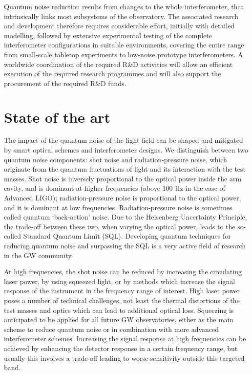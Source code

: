 Quantum noise reduction results from changes to the whole interferometer, that intrinsically links most subsystems of the observatory. The associated research and development therefore requires considerable effort, initially with detailed modelling, followed by extensive experimental testing of the complete interferometer configurations in suitable environments, covering the entire range from small-scale tabletop experiments to low-noise prototype interferometers. A worldwide coordination of the required R\&D activities will allow an efficient execution of the required research programmes and will also support the procurement of the required R\&D funds. 
 
\section{State of the art}
The impact of the quantum noise of the light field can be shaped and mitigated by smart optical schemes and interferometer designs. We distinguish between two quantum noise components: shot noise and radiation-pressure noise, which originate from the quantum fluctuations of light and its interaction with the test masses. Shot noise is inversely proportional to the optical power inside the arm cavity, and is dominant at higher frequencies (above 100 Hz in the case of Advanced LIGO); radiation-pressure noise is proportional to the optical power, and it is dominant at low frequencies. Radiation-pressure noise is sometimes called quantum `back-action' noise. Due to the Heisenberg Uncertainty Principle, the trade-off between these two, when varying the optical power, leads to the so-called Standard Quantum Limit (SQL). Developing quantum techniques for reducing quantum noise and surpassing the SQL is a very active field of research in the GW community. 

At high frequencies, the shot noise can be reduced by increasing the circulating laser power, by using squeezed light, or by methods which increase the signal response of the instrument in the frequency range of interest. High laser power poses a number of technical challenges, not least the thermal distortions of the test masses and optics which can lead to additional optical loss.  Squeezing is anticipated to be applied for all future GW observatories, either as the main scheme to reduce quantum noise or in combination with more advanced interferometer schemes. Increasing the signal response at high frequencies can be achieved by enhancing the detector response in a certain frequency range, but usually this involves a trade-off leading to worse sensitivity outside this targeted band.  

